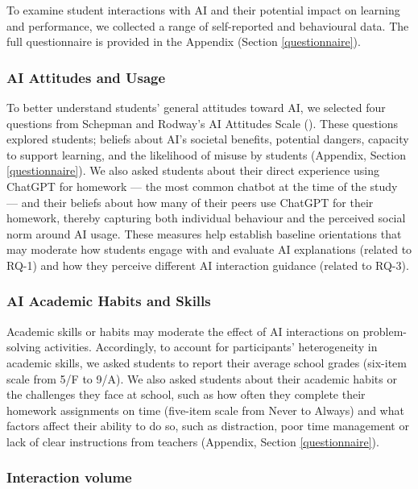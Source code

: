\documentclass[
  12pt,
]{article}
\begin{document}
To examine student interactions with AI and their potential impact on learning and performance, we collected a range of self-reported and behavioural data. The full questionnaire is provided in the Appendix (Section \ref{questionnaire}).

\subsubsection{AI Attitudes and Usage}\label{ai-attitudes-and-usage}

To better understand students' general attitudes toward AI, we selected four questions from Schepman and Rodway's AI Attitudes Scale (). These questions explored students; beliefs about AI's societal benefits, potential dangers, capacity to support learning, and the likelihood of misuse by students (Appendix, Section \ref{questionnaire}). We also asked students about their direct experience using ChatGPT for homework --- the most common chatbot at the time of the study --- and their beliefs about how many of their peers use ChatGPT for their homework, thereby capturing both individual behaviour and the perceived social norm around AI usage. These measures help establish baseline orientations that may moderate how students engage with and evaluate AI explanations (related to RQ-1) and how they perceive different AI interaction guidance (related to RQ-3).

\subsubsection{AI Academic Habits and Skills}\label{ai-academic-habits-and-skills}

Academic skills or habits may moderate the effect of AI interactions on problem-solving activities. Accordingly, to account for participants' heterogeneity in academic skills, we asked students to report their average school grades (six-item scale from 5/F to 9/A). We also asked students about their academic habits or the challenges they face at school, such as how often they complete their homework assignments on time (five-item scale from Never to Always) and what factors affect their ability to do so, such as distraction, poor time management or lack of clear instructions from teachers (Appendix, Section \ref{questionnaire}).

\subsubsection{Interaction volume}\label{interaction-volume}
\end{document}
